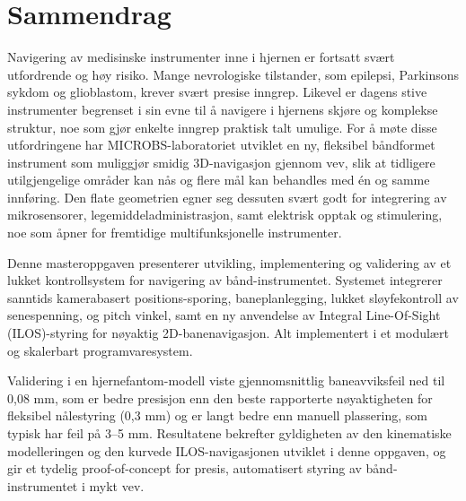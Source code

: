 \section*{Sammendrag}

Navigering av medisinske instrumenter inne i hjernen er fortsatt svært utfordrende og høy risiko. Mange nevrologiske tilstander, som epilepsi, Parkinsons sykdom og glioblastom, krever svært presise inngrep. Likevel er dagens stive instrumenter begrenset i sin evne til å navigere i hjernens skjøre og komplekse struktur, noe som gjør enkelte inngrep praktisk talt umulige. For å møte disse utfordringene har MICROBS-laboratoriet utviklet en ny, fleksibel båndformet instrument som muliggjør smidig 3D-navigasjon gjennom vev, slik at tidligere utilgjengelige områder kan nås og flere mål kan behandles med én og samme innføring. Den flate geometrien egner seg dessuten svært godt for integrering av mikrosensorer, legemiddeladministrasjon, samt elektrisk opptak og stimulering, noe som åpner for fremtidige multifunksjonelle instrumenter.

Denne masteroppgaven presenterer utvikling, implementering og validering av et lukket kontrollsystem for navigering av bånd-instrumentet. Systemet integrerer sanntids kamerabasert positions-sporing, baneplanlegging, lukket sløyfekontroll av senespenning, og pitch vinkel, samt en ny anvendelse av Integral Line-Of-Sight (ILOS)-styring for nøyaktig 2D-banenavigasjon. Alt implementert i et modulært og skalerbart programvaresystem.

Validering i en hjernefantom-modell viste gjennomsnittlig baneavviksfeil ned til 0,08 mm, som er bedre presisjon enn den beste rapporterte nøyaktigheten for fleksibel nålestyring (0,3 mm) og er langt bedre enn manuell plassering, som typisk har feil på 3–5 mm. Resultatene bekrefter gyldigheten av den kinematiske modelleringen og den kurvede ILOS-navigasjonen utviklet i denne oppgaven, og gir et tydelig proof-of-concept for presis, automatisert styring av bånd-instrumentet i mykt vev.
